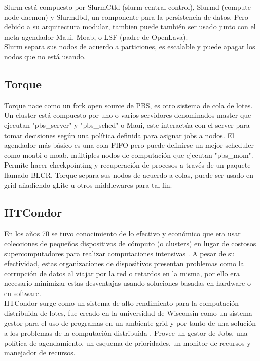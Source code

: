 Slurm está compuesto por SlurmCtld (slurm central control), Slurmd (compute node daemon) y Slurmdbd, un componente para la persistencia de datos. Pero debido a su arquitectura modular, tambien puede también ser usado junto con el meta-agendador Maui, Moab, o LSF (padre de OpenLava).\\

Slurm separa sus nodos de acuerdo a particiones, es escalable y puede apagar los nodos que no está usando.

\subsection{Torque}
Torque nace como un fork open source de PBS, es otro sistema de cola de lotes. Un cluster está compuesto por uno o varios servidores denominados master que ejecutan "pbs\_server" y "pbs\_sched" o Maui, este interactúa con el server para tomar decisiones según una política definida para asignar jobs a nodos. El agendador más básico es una cola FIFO pero puede definirse un mejor scheduler como moabi o moab. múltiples nodos de computación que ejecutan "pbs\_mom". Permite hacer checkpointing y recuperación de procesos a través de un paquete llamado BLCR. Torque separa sus nodos de acuerdo a colas, puede ser usado en grid añadiendo gLite u otros middlewares para tal fin.

\subsection{HTCondor}
En los años 70 se tuvo conocimiento de lo efectivo y económico que era usar colecciones de pequeños dispositivos de cómputo (o clusters) en lugar de costosos supercomputadores para realizar computaciones intensivas\cite{Chandy:1985:DSD:214451.214456} \cite{Needham:1979:SAC:800215.806573}. A pesar de su efectividad, estas organizaciones de dispositivos presentan problemas como la corrupción de datos al viajar por la red o retardos en la misma, por ello era necesario minimizar estas desventajas usando soluciones basadas en hardware o en software.\\

HTCondor surge como un sistema de alto rendimiento para la computación distribuida de lotes, fue creado en la universidad de Wisconsin como un sistema gestor para el uso de programas en un ambiente grid y por tanto de una solución a los problemas de la computación distribuida \cite{Tannenbaum:2001:CDJ:509876.509893}. Provee un gestor de Jobs, una política de agendamiento, un esquema de prioridades, un monitor de recursos y manejador de recursos. \\

